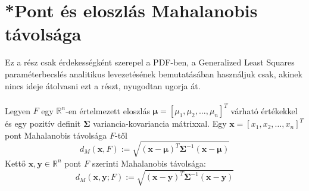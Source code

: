 \documentclass[14p]{report}
\def\pmb{\boldsymbol}
\newcounter{x}
\newcounter{y}
\newcounter{z}
\begin{document}
	\section{*Pont és eloszlás Mahalanobis távolsága}
	Ez a rész csak érdekességként szerepel a PDF-ben, a Generalized Least Squares paraméterbecslés analitikus levezetésének bemutatásában használjuk csak, akinek nincs ideje átolvasni ezt a részt, nyugodtan ugorja át.
	\\
	\\
	Legyen $F$ egy $\mathbb{R}^{n}$-en értelmezett eloszlás $\pmb{\mu} = [\mu_1, \mu_2, \dots, \mu_n]^T$ várható értékekkel és egy pozitív definit $\pmb{\Sigma}$ variancia-kovariancia mátrixxal. Egy $\pmb{x} = [x_1, x_2, \dots, x_n]^T$ pont Mahalanobis távolsága $F$-től
	\[
		d_M(\pmb{x}, F) := \sqrt{(\pmb{x} - \pmb{\mu})^T\pmb{\Sigma}^{-1}(\pmb{x} - \pmb{\mu})}
	\]
	Kettő $\pmb{x}, \pmb{y} \in \mathbb{R}^n$ pont $F$ szerinti Mahalanobis távolsága:
	\[
		d_M(\pmb{x}, \pmb{y}; F) := \sqrt{(\pmb{x} - \pmb{y})^T\pmb{\Sigma}^{-1}(\pmb{x} - \pmb{y})}
	\]
\end{document}
